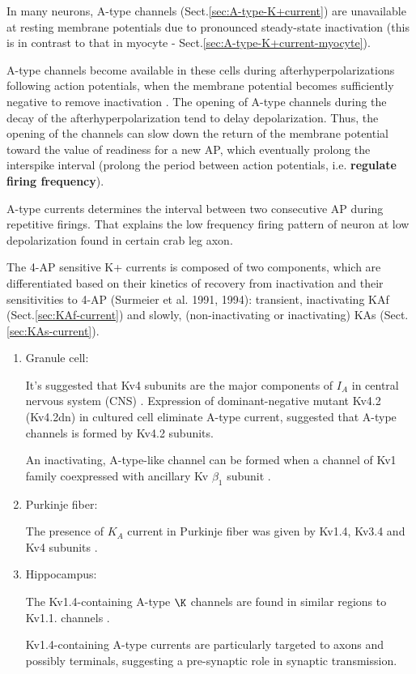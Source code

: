 In many neurons, A-type channels (Sect.\ref{sec:A-type-K+current}) are
unavailable at resting membrane potentials due to pronounced steady-state
inactivation (this is in contrast to that in myocyte -
Sect.\ref{sec:A-type-K+current-myocyte}).

A-type channels become available in these cells during afterhyperpolarizations
following action potentials, when the membrane potential becomes sufficiently
negative to remove inactivation \citep{cai2007}.
The opening of A-type channels during the decay of the afterhyperpolarization
tend to delay depolarization. Thus, the opening of the channels can slow down
the return of the membrane potential toward the value of readiness for a new AP,
which eventually prolong the interspike interval (prolong the period between
action potentials, i.e. {\bf regulate firing frequency}).

A-type currents determines the interval between two consecutive AP during
repetitive firings. That explains the low frequency firing pattern of neuron at
low depolarization found in certain crab leg axon.

The 4-AP sensitive K+ currents is composed of two components, which
are differentiated based on their kinetics of recovery from inactivation and
their sensitivities to 4-AP (Surmeier et al.
1991, 1994): transient, inactivating KAf (Sect.\ref{sec:KAf-current}) and
slowly, (non-inactivating or inactivating) KAs (Sect.\ref{sec:KAs-current}).

\begin{enumerate}
  \item Granule cell:
  
It's suggested that Kv4 subunits are the major components of $I_A$ in central
nervous system (CNS) \citep{serodio1998}.
Expression of dominant-negative mutant Kv4.2 (Kv4.2dn) in cultured cell
eliminate A-type current, suggested that A-type channels is formed by
Kv4.2 subunits.

An inactivating,  A-type-like channel can be formed when a channel of Kv1 family
coexpressed with ancillary Kv $\beta_1$ subunit \citep{shibata2000}.
  
  \item Purkinje fiber:

The presence of $K_A$ current in Purkinje fiber was given by Kv1.4, Kv3.4 and
Kv4 subunits  \citep{hounsgaard1988}.

  \item Hippocampus:
  
  The Kv1.4-containing A-type $\K$ channels are found in similar regions
  to Kv1.1. channels \citep{cooper1998}. 

  Kv1.4-containing A-type currents are particularly targeted to axons and
  possibly terminals, suggesting a pre-synaptic role in synaptic transmission.

\end{enumerate}
  

